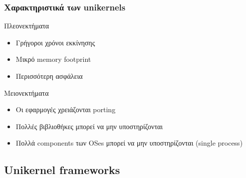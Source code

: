\documentclass[red,slidestop,notes,compress,mathserif]{beamer}
\begin{document}
\begin{frame}
\frametitle{Χαρακτηριστικά των unikernels}
\begin{block}{Πλεονεκτήματα}
\begin{itemize}
\item Γρήγοροι χρόνοι εκκίνησης
\item Μικρό memory footprint
\item Περισσότερη ασφάλεια
\end{itemize}
\end{block}
\begin{block}{Μειονεκτήματα}
\begin{itemize}
\item Οι εφαρμογές χρειάζονται porting
\item Πολλές βιβλιοθήκες μπορεί να μην υποστηρίζονται
\item Πολλά components των OSes μπορεί να μην υποστηρίζονται (single process)
\end{itemize}
\end{block}
\end{frame}

\subsection{Unikernel frameworks}
\end{document}
